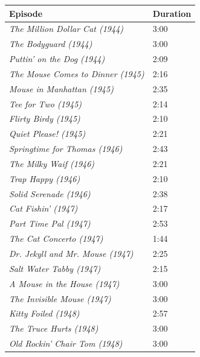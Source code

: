 \documentclass[report, 11pt, oneside]{dissertation}
\begin{document}
\begin{table}[]
\begin{tabular}{l|l|}
\hline
\multicolumn{1}{|l|}{Episode} & Duration \\ \hline
\multicolumn{1}{|l|}{\textit{The Million Dollar Cat (1944)}} & 3:00 \\ \hline
\multicolumn{1}{|l|}{\textit{The Bodyguard (1944)}} & 3:00 \\ \hline
\multicolumn{1}{|l|}{\textit{Puttin’ on the Dog (1944)}} & 2:09 \\ \hline
\multicolumn{1}{|l|}{\textit{The Mouse Comes to Dinner (1945)}} & 2:16 \\ \hline
\multicolumn{1}{|l|}{\textit{Mouse in Manhattan (1945)}} & 2:35 \\ \hline
\multicolumn{1}{|l|}{\textit{Tee for Two (1945)}} & 2:14 \\ \hline
\multicolumn{1}{|l|}{\textit{Flirty Birdy (1945)}} & 2:10 \\ \hline
\multicolumn{1}{|l|}{\textit{Quiet Please! (1945)}} & 2:21 \\ \hline
\multicolumn{1}{|l|}{\textit{Springtime for Thomas (1946)}} & 2:43 \\ \hline
\multicolumn{1}{|l|}{\textit{The Milky Waif (1946)}} & 2:21 \\ \hline
\multicolumn{1}{|l|}{\textit{Trap Happy (1946)}} & 2:10 \\ \hline
\multicolumn{1}{|l|}{\textit{Solid Serenade (1946)}} & 2:38 \\ \hline
\multicolumn{1}{|l|}{\textit{Cat Fishin' (1947)}} & 2:17 \\ \hline
\multicolumn{1}{|l|}{\textit{Part Time Pal (1947)}} & 2:53 \\ \hline
\multicolumn{1}{|l|}{\textit{The Cat Concerto (1947)}} & 1:44 \\ \hline
\multicolumn{1}{|l|}{\textit{Dr. Jekyll and Mr. Mouse (1947)}} & 2:25 \\ \hline
\multicolumn{1}{|l|}{\textit{Salt Water Tabby (1947)}} & 2:15 \\ \hline
\multicolumn{1}{|l|}{\textit{A Mouse in the House (1947)}} & 3:00 \\ \hline
\multicolumn{1}{|l|}{\textit{The Invisible Mouse (1947)}} & 3:00 \\ \hline
\multicolumn{1}{|l|}{\textit{Kitty Foiled (1948)}} & 2:57 \\ \hline
\multicolumn{1}{|l|}{\textit{The Truce Hurts (1948)}} & 3:00 \\ \hline
\multicolumn{1}{|l|}{\textit{Old Rockin' Chair Tom (1948)}} & 3:00 \\ \hline

\end{tabular}
\end{table}
\end{document}
